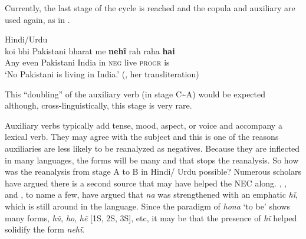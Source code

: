 ﻿\documentclass[output=paper]{langsci/langscibook}
\begin{document}
%
Currently, the last stage of the cycle is reached and the copula and
auxiliary are used again, as in .
%
\begin{exe}\ex Hindi\slash Urdu \label{ex:other-hindi-pakistani}\\
    \gll koi bhi Pakistani bharat me \textbf{nehĩ} rah raha \textbf{hai}\\
Any even Pakistani India in   \textsc{neg}   live   \textsc{progr}   is \\
    \glt `No Pakistani is living in India.' (\citealt[17]{Lampp2006}, her transliteration)
    \end{exe}
%
This ``doubling'' of the auxiliary verb (in stage C\textasciitilde{}A) would be expected
although, cross-linguistically, this stage is very rare.

Auxiliary verbs typically add tense, mood, aspect, or voice and accompany a
lexical verb. They may agree with the subject and this is one of the
reasons auxiliaries are less likely to be reanalyzed as negatives. Because
they are inflected in many languages, the forms will be many and that stops
the reanalysis. So how was the reanalysis from stage A to B in Hindi\slash
Urdu possible? Numerous scholars have argued there is a second source that
may have helped the NEC along. \citet[413]{Whitney1889},
\citet[404]{Turner1966}, and \citet[7]{Bashir2006}, to name a few,  have
argued that \textit{na} was strengthened with an emphatic \textit{hĩ},
which is still around in the language. Since the paradigm of \textit{hona}
`to be' shows many forms, \textit{hũ}, \textit{ho}, \textit{hẽ} [1S, 2S,
3S], etc, it may be that the presence of \textit{hĩ} helped solidify the
form \textit{nehĩ}.
\end{document}
